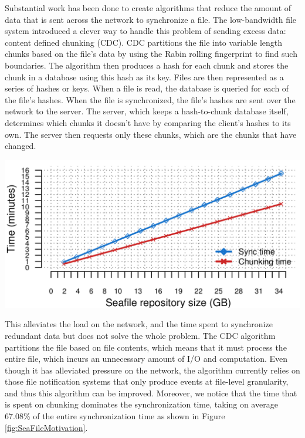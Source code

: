 \documentclass[table]{article}
\newenvironment{Figure}
  {\par\medskip\noindent\minipage{\linewidth}}
  {\endminipage\par\medskip}
\begin{document}
\begin{multicols}{2}
Substantial work has been done to create algorithms that reduce the amount of data that is sent across the network to synchronize a file. The low-bandwidth file system \cite{cdc} introduced a clever way to handle this problem of sending excess data: content defined chunking (CDC). CDC partitions the file into variable length chunks based on the file's data by using the Rabin rolling fingerprint \cite{rabin} to find such boundaries. The algorithm then produces a hash for each chunk and stores the chunk in a database using this hash as its key. Files are then represented as a series of hashes or keys. When a file is read, the database is queried for each of the file's hashes. When the file is synchronized, the file's hashes are sent over the network to the server. The server, which keeps a hash-to-chunk database itself, determines which chunks it doesn't have by comparing the client's hashes to its own. The server then requests only these chunks, which are the chunks that have changed.\\

\begin{Figure}
 \centering
 \includegraphics[width=\linewidth]{motivation_real.png}
 \label{fig:SeaFileMotivation}
\end{Figure}

This alleviates the load on the network, and the time spent to synchronize redundant data but does not solve the whole problem. The CDC algorithm partitions the file based on file contents, which means that it must process the entire file, which incurs an unnecessary amount of I/O and computation. Even though it has alleviated pressure on the network, the algorithm currently relies on those file notification systems that only produce events at file-level granularity, and thus this algorithm can be improved. Moreover, we notice that the time that is spent on chunking dominates the synchronization time, taking on average 67.08\% of the entire synchronization time as shown in Figure \ref{fig:SeaFileMotivation}.\\


\end{multicols}
\end{document}
